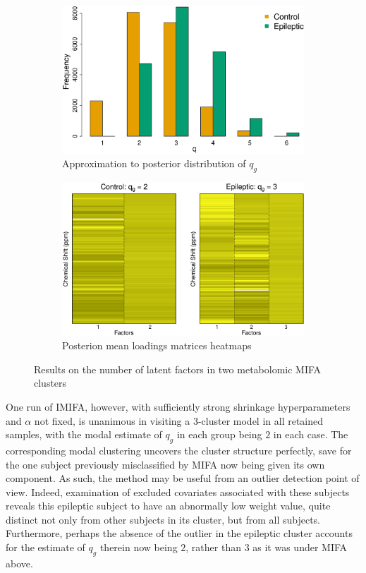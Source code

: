\documentclass[a4paper,12pt,fleqn]{article}
\numberwithin{equation}{section}
\begin{document}
\begin{figure}[h]
	\centering
	\begin{subfigure}{0.5\textwidth}
		\centering
		\includegraphics[width=\linewidth, keepaspectratio]{Qdist.eps}
		\caption{Approximation to posterior distribution of $q_g$}
		\label{MIFA_Qdist}
	\end{subfigure}%
	\begin{subfigure}{0.5\textwidth}
		\centering
		\includegraphics[width=\linewidth, keepaspectratio]{Loadings_Heatmap.eps}
		\caption{Posterion mean loadings matrices heatmaps}
		\label{MIFA_Loadings}
	\end{subfigure}
		\caption{Results on the number of latent factors in two metabolomic MIFA clusters}
		\label{MIFA_UrineResults}
\end{figure}

One run of IMIFA, however, with sufficiently strong shrinkage hyperparameters and $\alpha$ not fixed, is unanimous in visiting a $3$-cluster model in all retained samples, with the modal estimate of $q_g$ in each group being $2$ in each case. The corresponding modal clustering uncovers the cluster structure perfectly, save for the one subject previously misclassified by MIFA now being given its own component. As such, the method may be useful from an outlier detection point of view. Indeed, examination of excluded covariates associated with these subjects reveals this epileptic subject to have an abnormally low weight value, quite distinct not only from other subjects in its cluster, but from all subjects. Furthermore, perhaps the absence of the outlier in the epileptic cluster accounts for the estimate of $q_g$ therein now being $2$, rather than $3$ as it was under MIFA above.
\end{document}
